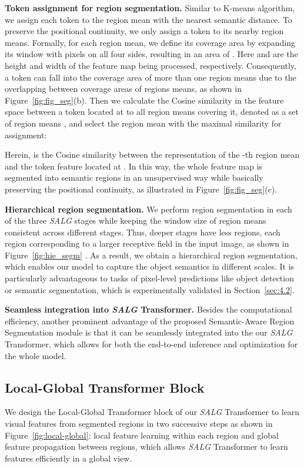 \smallskip\noindent\textbf{Token assignment for region segmentation.} Similar to K-means algorithm, we assign each token to the region mean with the nearest semantic distance. To preserve the positional continuity, we only assign a token to its nearby region means. Formally, for each region mean, we define its coverage area by expanding its window with  pixels on all four sides, resulting in an area of . Here  and  are the height and width of the feature map being processed, respectively. Consequently, a token can fall into the coverage area of more than one region means due to the overlapping between coverage areas of regions means, as shown in Figure~\ref{fig:fig_seg}(b). Then we calculate the Cosine similarity in the feature space between a token located at  to all region means covering it, denoted as a set of region means , and select the region mean  with the maximal similarity for assignment:

Herein,  is the Cosine similarity between the representation  of the -th region mean and the token feature  located at . In this way, the whole feature map is segmented into semantic regions in an unsupervised way while basically preserving the positional continuity, as illustrated in Figure~\ref{fig:fig_seg}(c). 

\smallskip\noindent\textbf{Hierarchical region segmentation.} We perform region segmentation in each of the  three \emph{SALG} stages while keeping the window size of region means consistent across different stages. Thus, deeper stages have less regions, each region corresponding to a larger receptive field in the input image, as shown in Figure~\ref{fig:hie_segm} . As a result, we obtain a hierarchical region segmentation, which enables our model to capture the object semantics in  different scales. It is particularly advantageous to tasks of pixel-level predictions like object detection or semantic segmentation, which is experimentally validated in Section~\ref{sec:4.2}.

\smallskip\noindent\textbf{Seamless integration into \emph{SALG} Transformer.} Besides the computational efficiency, another prominent advantage of the proposed Semantic-Aware Region Segmentation module is that it can be seamlessly integrated into the our \emph{SALG} Transformer, which allows for both the end-to-end inference and optimization for the whole model.


\subsection{Local-Global Transformer Block}
\label{sec:3.3}
We design the Local-Global Transformer block of our \emph{SALG} Transformer to learn visual features from segmented regions in two successive steps as shown in Figure~\ref{fig:local-global}: local feature learning within each region and global feature propagation between regions, which allows \emph{SALG} Transformer to learn features efficiently in a global view.


